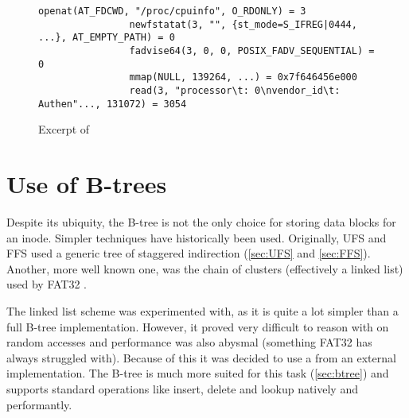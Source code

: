         \begin{figure}[h]
            \begin{lstlisting}[gobble=16]
                openat(AT_FDCWD, "/proc/cpuinfo", O_RDONLY) = 3
                newfstatat(3, "", {st_mode=S_IFREG|0444, ...}, AT_EMPTY_PATH) = 0
                fadvise64(3, 0, 0, POSIX_FADV_SEQUENTIAL) = 0
                mmap(NULL, 139264, ...) = 0x7f646456e000
                read(3, "processor\t: 0\nvendor_id\t: Authen"..., 131072) = 3054
            \end{lstlisting}
            \caption{Excerpt of }
            \label{fig:cat_strace}
            \vspace{-20pt}
        \end{figure}

    \section{Use of B-trees}
        \label{sec:design_btree}

        Despite its ubiquity, the B-tree is not the only choice for storing
        data blocks for an inode. Simpler techniques have historically been
        used. Originally, UFS and FFS used a generic tree of staggered
        indirection (\autoref{sec:UFS} and \autoref{sec:FFS}). Another, more well known
        one, was the chain of clusters (effectively a linked list) used by
        FAT32 \cite{fat32}.

        The linked list scheme was experimented with, as it is quite a lot
        simpler than a full B-tree implementation. However, it proved very
        difficult to reason with on random accesses and performance was also
        abysmal (something FAT32 has always struggled with). Because of this
        it was decided to use a \bplustree{} from an external implementation. The
        B-tree is much more suited for this task (\autoref{sec:btree}) and supports
        standard operations like insert, delete and lookup natively and
        performantly.

